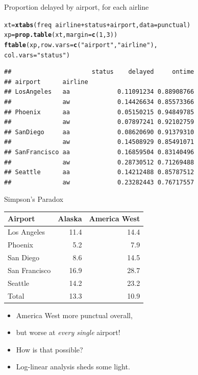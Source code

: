 \documentclass[unknownkeysallowed]{beamer}\usepackage[]{graphicx}\usepackage[]{color}
\makeatletter
\newcommand{\hlnum}[1]{\textcolor[rgb]{0.686,0.059,0.569}{#1}}%
\newcommand{\hlstr}[1]{\textcolor[rgb]{0.192,0.494,0.8}{#1}}%
\newcommand{\hlopt}[1]{\textcolor[rgb]{0,0,0}{#1}}%
\newcommand{\hlstd}[1]{\textcolor[rgb]{0.345,0.345,0.345}{#1}}%
\newcommand{\hlkwb}[1]{\textcolor[rgb]{0.69,0.353,0.396}{#1}}%
\newcommand{\hlkwc}[1]{\textcolor[rgb]{0.333,0.667,0.333}{#1}}%
\newcommand{\hlkwd}[1]{\textcolor[rgb]{0.737,0.353,0.396}{\textbf{#1}}}%
\newenvironment{kframe}{%
 \def\at@end@of@kframe{}%
 \ifinner\ifhmode%
  \def\at@end@of@kframe{\end{minipage}}%
  \begin{minipage}{\columnwidth}%
 \fi\fi%
 \def\FrameCommand##1{\hskip\@totalleftmargin \hskip-\fboxsep
 \colorbox{shadecolor}{##1}\hskip-\fboxsep
     \hskip-\linewidth \hskip-\@totalleftmargin \hskip\columnwidth}%
 \MakeFramed {\advance\hsize-\width
   \@totalleftmargin\z@ \linewidth\hsize
   \@setminipage}}%
 {\par\unskip\endMakeFramed%
 \at@end@of@kframe}
\newenvironment{knitrout}{}{} %
\makeatother
\begin{document}
\begin{frame}[fragile]{Proportion delayed by airport, for each airline}
  
\begin{knitrout}\footnotesize
{}\color{fgcolor}\begin{kframe}
\begin{alltt}
\hlstd{xt}\hlkwb{=}\hlkwd{xtabs}\hlstd{(freq}\hlopt{~}\hlstd{airline}\hlopt{+}\hlstd{status}\hlopt{+}\hlstd{airport,}\hlkwc{data}\hlstd{=punctual)}
\hlstd{xp}\hlkwb{=}\hlkwd{prop.table}\hlstd{(xt,}\hlkwc{margin}\hlstd{=}\hlkwd{c}\hlstd{(}\hlnum{1}\hlstd{,}\hlnum{3}\hlstd{))}
\hlkwd{ftable}\hlstd{(xp,}\hlkwc{row.vars}\hlstd{=}\hlkwd{c}\hlstd{(}\hlstr{"airport"}\hlstd{,}\hlstr{"airline"}\hlstd{),}
\hlkwc{col.vars}\hlstd{=}\hlstr{"status"}\hlstd{)}
\end{alltt}
\begin{verbatim}
##                      status    delayed     ontime
## airport      airline                             
## LosAngeles   aa             0.11091234 0.88908766
##              aw             0.14426634 0.85573366
## Phoenix      aa             0.05150215 0.94849785
##              aw             0.07897241 0.92102759
## SanDiego     aa             0.08620690 0.91379310
##              aw             0.14508929 0.85491071
## SanFrancisco aa             0.16859504 0.83140496
##              aw             0.28730512 0.71269488
## Seattle      aa             0.14212488 0.85787512
##              aw             0.23282443 0.76717557
\end{verbatim}
\end{kframe}
\end{knitrout}


\end{frame}


\begin{frame}{Simpson's Paradox}

\begin{tabular}{|l|rr|}
  \hline
  Airport & Alaska & America West\\
  \hline
  Los Angeles & 11.4 & 14.4\\
  Phoenix & 5.2 & 7.9\\
  San Diego & 8.6 & 14.5\\
  San Francisco & 16.9 & 28.7\\
  Seattle & 14.2 & 23.2 \\
  \hline
  Total & 13.3 & 10.9 \\
  \hline
  
\end{tabular}

  \begin{itemize}
  \item America West more punctual overall,
  \item but worse at \emph{every single} airport!
  \item How is that possible?
  \item Log-linear analysis sheds some light.
  \end{itemize}
  
\end{frame}
\end{document}
